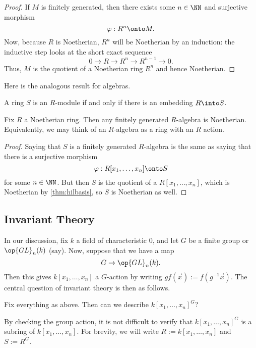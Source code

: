 \begin{proof}
	If $M$ is finitely generated, then there exists some $n\in\NN$ and surjective morphism
	\[\varphi:R^n\onto M.\]
	Now, because $R$ is Noetherian, $R^n$ will be Noetherian by an induction: the inductive step looks at the short exact sequence
	\[0\to R\to R^n\to R^{n-1}\to 0.\]
	Thus, $M$ is the quotient of a Noetherian ring $R^n$ and hence Noetherian.
\end{proof}
Here is the analogous result for algebras.
\begin{definition}[Algebra]
	A ring $S$ is an $R$-module if and only if there is an embedding $R\into S$.
\end{definition}
\begin{prop}
	Fix $R$ a Noetherian ring. Then any finitely generated $R$-algebra is Noetherian. Equivalently, we may think of an $R$-algebra as a ring with an $R$ action.
\end{prop}
\begin{proof}
	Saying that $S$ is a finitely generated $R$-algebra is the same as saying that there is a surjective morphism
	\[\varphi:R[x_1,\ldots,x_n]\onto S\]
	for some $n\in\NN$. But then $S$ is the quotient of a $R[x_1,\ldots,x_n]$, which is Noetherian by \autoref{thm:hilbasis}, so $S$ is Noetherian as well.
\end{proof}

\subsection{Invariant Theory}
In our discussion, fix $k$ a field of characteristic $0$, and let $G$ be a finite group or $\op{GL}_n(k)$ (say). Now, suppose that we have a map
\[G\to\op{GL}_n(k).\]
Then this gives $k[x_1,\ldots,x_n]$ a $G$-action by writing $gf(\vec x):=f(g^{-1}\vec x).$ The central question of invariant theory is then as follows.
\begin{ques}
	Fix everything as above. Then can we describe $k[x_1,\ldots,x_n]^G$?
\end{ques}
By checking the group action, it is not difficult to verify that $k[x_1,\ldots,x_n]^G$ is a subring of $k[x_1,\ldots,x_n]$. For brevity, we will write $R:=k[x_1,\ldots,x_n]$ and $S:=R^G$.

